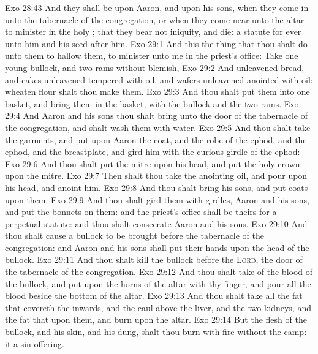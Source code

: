 \vs Exo 28:43 And they shall be upon Aaron, and upon his sons, when they come in unto the tabernacle of the congregation, or when they come near unto the altar to minister in the holy ; that they bear not iniquity, and die:  a statute for ever unto him and his seed after him.
\vs Exo 29:1 And this  the thing that thou shalt do unto them to hallow them, to minister unto me in the priest's office: Take one young bullock, and two rams without blemish,
\vs Exo 29:2 And unleavened bread, and cakes unleavened tempered with oil, and wafers unleavened anointed with oil:  wheaten flour shalt thou make them.
\vs Exo 29:3 And thou shalt put them into one basket, and bring them in the basket, with the bullock and the two rams.
\vs Exo 29:4 And Aaron and his sons thou shalt bring unto the door of the tabernacle of the congregation, and shalt wash them with water.
\vs Exo 29:5 And thou shalt take the garments, and put upon Aaron the coat, and the robe of the ephod, and the ephod, and the breastplate, and gird him with the curious girdle of the ephod:
\vs Exo 29:6 And thou shalt put the mitre upon his head, and put the holy crown upon the mitre.
\vs Exo 29:7 Then shalt thou take the anointing oil, and pour  upon his head, and anoint him.
\vs Exo 29:8 And thou shalt bring his sons, and put coats upon them.
\vs Exo 29:9 And thou shalt gird them with girdles, Aaron and his sons, and put the bonnets on them: and the priest's office shall be theirs for a perpetual statute: and thou shalt consecrate Aaron and his sons.
\vs Exo 29:10 And thou shalt cause a bullock to be brought before the tabernacle of the congregation: and Aaron and his sons shall put their hands upon the head of the bullock.
\vs Exo 29:11 And thou shalt kill the bullock before the \textsc{Lord},  the door of the tabernacle of the congregation.
\vs Exo 29:12 And thou shalt take of the blood of the bullock, and put  upon the horns of the altar with thy finger, and pour all the blood beside the bottom of the altar.
\vs Exo 29:13 And thou shalt take all the fat that covereth the inwards, and the caul  above the liver, and the two kidneys, and the fat that  upon them, and burn  upon the altar.
\vs Exo 29:14 But the flesh of the bullock, and his skin, and his dung, shalt thou burn with fire without the camp: it  a sin offering.
